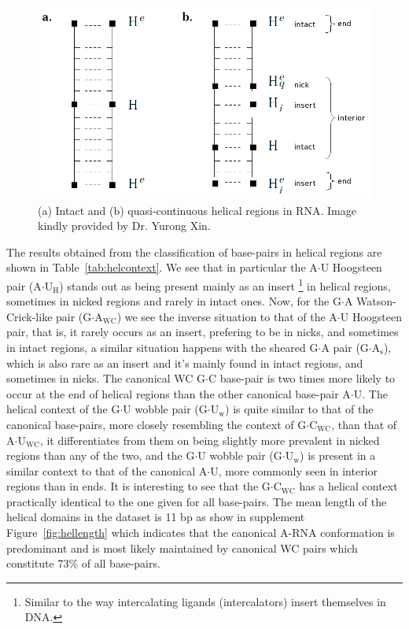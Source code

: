 \begin{figure}
\centering
\includegraphics[scale=0.4]{Chapter3/helcontext.png}
\caption{(a)  Intact  and  (b)  quasi-continuous  helical  regions  in
  RNA. Image kindly provided by Dr. Yurong Xin.}
\label{fig:helregxin}
\end{figure}  

The results obtained from  the classification of base-pairs in helical
regions  are  shown in  Table~\ref{tab:helcontext}.   We  see that  in
particular  the   A$\cdot$U  Hoogsteen  pair  (A$\cdot$U$_{\text{H}}$)
stands out as  being present mainly as an  insert \footnote{Similar to
  the way  intercalating ligands (intercalators)  insert themselves in
  DNA.} in helical regions, sometimes  in nicked regions and rarely in
intact   ones.   Now,   for  the   G$\cdot$A   Watson-Crick-like  pair
(G$\cdot$A$_{\text{WC}}$) we see the  inverse situation to that of the
A$\cdot$U  Hoogsteen pair,  that is,  it rarely  occurs as  an insert,
prefering to be  in nicks, and sometimes in  intact regions, a similar
situation     happens    with     the    sheared     G$\cdot$A    pair
(G$\cdot$A$_{\text{s}}$),  which is also  rare as  an insert  and it's
mainly found in intact regions, and sometimes in nicks.  The canonical
WC G$\cdot$C base-pair is two times more likely to occur at the end of
helical  regions than  the other  canonical base-pair  A$\cdot$U.  The
helical context of  the G$\cdot$U wobble pair (G$\cdot$U$_{\text{w}}$)
is quite  similar to  that of the  canonical base-pairs,  more closely
resembling  the  context  of  G$\cdot$C$_{\text{WC}}$,  than  that  of
A$\cdot$U$_{\text{WC}}$, it differentiates from them on being slightly
more  prevalent  in  nicked regions  than  any  of  the two,  and  the
G$\cdot$U wobble pair (G$\cdot$U$_{\text{w}}$) is present in a similar
context  to that  of the  canonical A$\cdot$U,  more commonly  seen in
interior  regions than in  ends.  It  is interesting  to see  that the
G$\cdot$C$_{\text{WC}}$ has a helical context practically identical to
the  one given for  all base-pairs.   The mean  length of  the helical
domains   in  the   dataset   is   11  bp   as   show  in   supplement
Figure~\ref{fig:hellength}  which indicates  that the  canonical A-RNA
conformation is predominant and is most likely maintained by canonical
WC pairs which constitute 73\% of all base-pairs.

